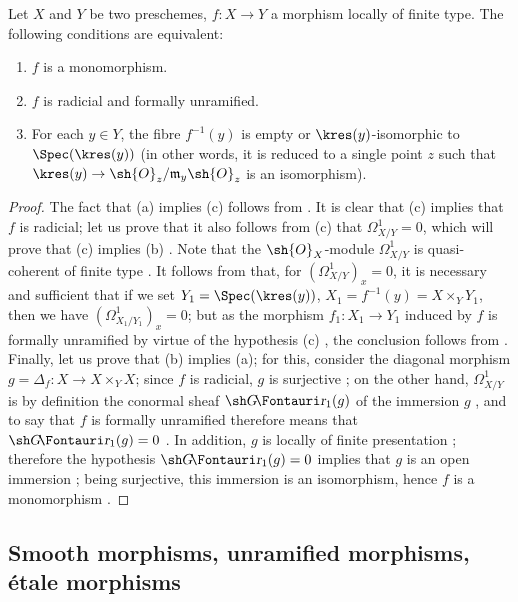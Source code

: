 \begin{proposition}[17.2.6]
\label{IV.17.2.6}
Let $X$ and $Y$ be two preschemes, $f:X\to Y$ a morphism locally of finite type. 
The following conditions are equivalent:
\begin{enumerate}
  \item[{\rm(a)}] $f$ is a monomorphism.
  \item[{\rm(b)}] $f$ is radicial and formally unramified.
  \item[{\rm(c)}] For each $y\in Y$, the fibre $f^{-1}(y)$ is empty or $\kres(y)$-isomorphic to $\Spec(\kres(y))$ (in other words, it is reduced to a single point $z$ such that $\kres(y)\to\sh{O}_z/\mathfrak{m}_y\sh{O}_z$ is an isomorphism).
\end{enumerate}
\end{proposition}

\begin{proof}
The fact that (a) implies (c) follows from . 
It is clear that (c) implies that $f$ is radicial;
let us prove that it also follows from (c) that $\Omega_{X/Y}^1=0$, which will prove that (c) implies (b) .
Note that the $\sh{O}_X$-module $\Omega_{X/Y}^1$ is quasi-coherent of finite type .
It follows from  that, for $(\Omega_{X/Y}^1)_x=0$, it is necessary and sufficient that if we set $Y_1=\Spec(\kres(y))$, $X_1=f^{-1}(y)=X\times_Y Y_1$, then we have $(\Omega_{X_1/Y_1}^1)_x=0$;
but as the morphism $f_1:X_1\to Y_1$ induced by $f$ is formally unramified by virtue of the hypothesis (c) , the conclusion follows from .
Finally, let us prove that (b) implies (a);
for this, consider the diagonal morphism $g=\Delta_f:X\to X\times_Y X$;
since $f$ is radicial, $g$ is surjective ;
on the other hand, $\Omega_{X/Y}^1$ is by definition the conormal sheaf $\shGr_1(g)$ of the immersion $g$ , and to say that $f$ is formally unramified therefore means that
$\shGr_1(g)=0$ . 
In addition, $g$ is locally of finite presentation ;
therefore the hypothesis $\shGr_1(g)=0$ implies that $g$ is an open immersion ;
being surjective, this immersion is an isomorphism, hence $f$ is a monomorphism .
\end{proof}

\subsection{Smooth morphisms, unramified morphisms, \'etale morphisms}
\label{subsection:IV.17.3}

